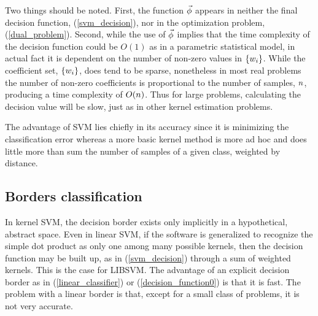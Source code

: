 Two things should be noted. First, the function $\vec\phi$ appears in
neither the final decision function, (\ref{svm_decision}), nor in the
optimization problem, (\ref{dual_problem}). Second, while the use of
$\vec\phi$ implies that the time complexity of the decision function 
could be $O(1)$ as in a parametric statistical model, in actual fact it is
dependent on the number of non-zero values in $\lbrace w_i \rbrace$.
While the coefficient set, $\lbrace w_i \rbrace$, does tend to be sparse,
nonetheless in most real problems the number of non-zero coefficients is
proportional to the number of samples, $n$, producing a time complexity
of $O(n)$. Thus for large problems, calculating the decision value will
be slow, just as in other kernel estimation problems.

The advantage of SVM lies chiefly in its accuracy since it is minimizing the
classification error whereas a more basic kernel method is more ad hoc
and does little more than sum the number of samples of a given class,
weighted by distance.

\subsection{Borders classification}

\label{border_method}

In kernel SVM, the decision border exists only implicitly in a hypothetical,
abstract space. Even in linear SVM, if the software is generalized to 
recognize the simple dot product as only one among many possible kernels,
then the decision function may be built up, as in (\ref{svm_decision})
through a sum of weighted kernels. This is the case for LIBSVM.
The advantage of an explicit decision border as in 
(\ref{linear_classifier}) or (\ref{decision_function0})
is that it is fast. The problem with a linear border is that, except for a
small class of problems, it is not very accurate.

